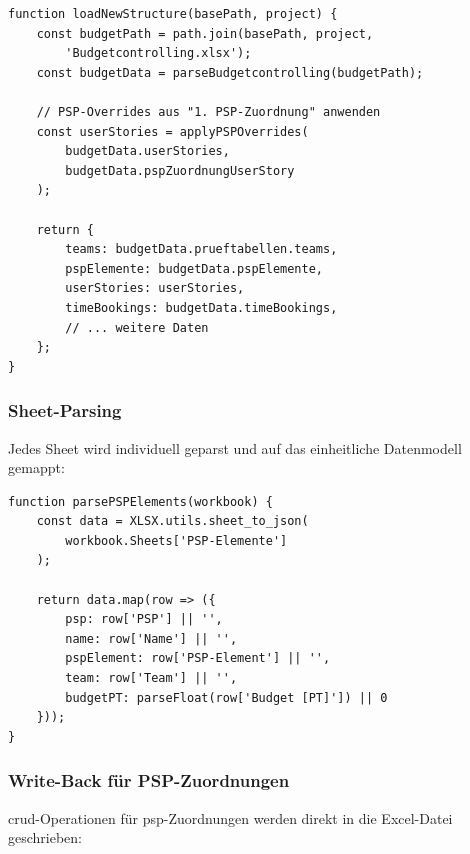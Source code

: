 \begin{lstlisting}[caption={Excel-Parser Hauptfunktion}, label={lst:excel-parser}]
function loadNewStructure(basePath, project) {
    const budgetPath = path.join(basePath, project,
        'Budgetcontrolling.xlsx');
    const budgetData = parseBudgetcontrolling(budgetPath);

    // PSP-Overrides aus "1. PSP-Zuordnung" anwenden
    const userStories = applyPSPOverrides(
        budgetData.userStories,
        budgetData.pspZuordnungUserStory
    );

    return {
        teams: budgetData.prueftabellen.teams,
        pspElemente: budgetData.pspElemente,
        userStories: userStories,
        timeBookings: budgetData.timeBookings,
        // ... weitere Daten
    };
}
\end{lstlisting}

\subsubsection{Sheet-Parsing}

Jedes Sheet wird individuell geparst und auf das einheitliche Datenmodell gemappt:

\begin{lstlisting}[caption={Parsing der PSP-Elemente}, label={lst:parse-psp}]
function parsePSPElements(workbook) {
    const data = XLSX.utils.sheet_to_json(
        workbook.Sheets['PSP-Elemente']
    );

    return data.map(row => ({
        psp: row['PSP'] || '',
        name: row['Name'] || '',
        pspElement: row['PSP-Element'] || '',
        team: row['Team'] || '',
        budgetPT: parseFloat(row['Budget [PT]']) || 0
    }));
}
\end{lstlisting}

\subsubsection{Write-Back für PSP-Zuordnungen}

\gls{crud}-Operationen für \gls{psp}-Zuordnungen werden direkt in die Excel-Datei geschrieben:

